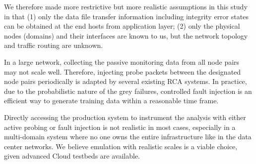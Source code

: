 We therefore made more restrictive but more realistic assumptions in this study in that (1) only the data file transfer information including integrity error states can be obtained at the end hosts from application layer; (2) only the physical nodes (domains) and their interfaces are known to us, but the network topology and traffic routing are unknown. 

In a large network, collecting the passive monitoring data from all node pairs may not scale well. Therefore, injecting probe packets between the designated node pairs periodically is adapted by several existing RCA systems. In practice, due to the probabilistic nature of the grey failures, controlled fault injection is an efficient way to generate training data within a reasonable time frame.

Directly accessing the production system to instrument the analysis with either active probing or fault injection is not realistic in most cases, especially in a multi-domain system where no one owns the entire infrastructure like in the data center networks. We believe emulation with realistic scales is a viable choice, given advanced Cloud testbeds are available.

